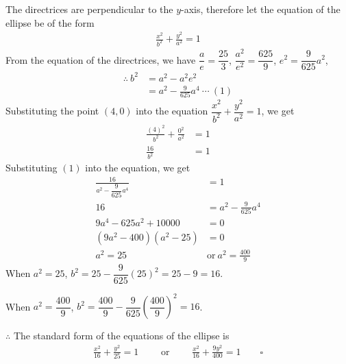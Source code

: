 \documentclass{report}
\newcommand{\eos}{ \qquad \square}
\begin{document}
\begin{enumerate}[leftmargin=*]
\begin{enumerate}
                    The directrices are perpendicular to the $y$-axis, therefore let the equation
                    of the ellipse be of the form
                    \begin{align*}
                        \frac{x^2}{b^2} + \frac{y^2}{a^2} = 1
                    \end{align*}
                    From the equation of the directrices, we have
                    $\dfrac{a}{e} = \dfrac{25}{3}$, $\dfrac{a^2}{e^2} = \dfrac{625}{9}$, $e^2 = \dfrac{9}{625}a^2$,
                    \begin{align*}
                        \therefore\ b^2 & = a^2 - a^2e^2                        \\
                                        & = a^2 - \frac{9}{625}a^4\ \cdots\ (1)
                    \end{align*}
                    Substituting the point $(4, 0)$ into the equation $\dfrac{x^2}{b^2} + \dfrac{y^2}{a^2} = 1$, we get
                    \begin{align*}
                        \frac{(4)^2}{b^2} + \frac{0^2}{a^2} & = 1 \\
                        \frac{16}{b^2}                      & = 1
                    \end{align*}
                    Substituting $(1)$ into the equation, we get
                    \begin{align*}
                        \frac{16}{a^2 - \dfrac{9}{625}a^4} & = 1                            \\
                        16                                 & = a^2 - \frac{9}{625}a^4       \\
                        9a^4 - 625a^2 + 10000              & = 0                            \\
                        (9a^2 - 400)(a^2 - 25)             & = 0                            \\
                        a^2 = 25\                          & \text{or}\ a^2 = \frac{400}{9}
                    \end{align*}
                    When $a^2 = 25$, $b^2 = 25 - \dfrac{9}{625}(25)^2 = 25 - 9 = 16$.

                    When $a^2 = \dfrac{400}{9}$, $b^2 = \dfrac{400}{9} -
                        \dfrac{9}{625}\left(\dfrac{400}{9}\right)^2 = 16$.

                    $\therefore$ The standard form of the equations of the ellipse is
                    \begin{align*}
                        \frac{x^2}{16} + \frac{y^2}{25} = 1\qquad \text{ or } \qquad \frac{x^2}{16} + \frac{9y^2}{400} = 1 \eos
                    \end{align*}


\end{enumerate}
\end{enumerate}
\end{document}
